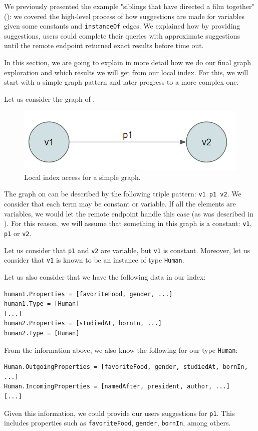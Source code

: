 We previously presented the example  "siblings that have directed a film together" (): we covered the high-level process of how suggestions are made for variables given some constants and \texttt{instanceOf} edges. We explained how by providing suggestions, users could complete their queries with approximate suggestions until the remote endpoint returned exact results before time out. 

In this section, we are going to explain in more detail how we do our final graph exploration and which results we will get from our local index. For this, we will start with a simple graph pattern and later progress to a more complex one.

\begin{example}
Let us consider the graph of .

\begin{figure}[H]
    \centering
        \includegraphics[width=0.5\linewidth]{imagenes/graph1.png}
        \caption{Local index access for a simple graph.}
        \label{fig:example_graph1}
\end{figure}

The graph on  can be described by the following triple pattern: \texttt{v1 p1 v2}. We consider that each term may be constant or variable. If all the elements are variables, we would let the remote endpoint handle this case (as was described in ). For this reason, we will assume that something in this graph is a constant: \texttt{v1}, \texttt{p1} or \texttt{v2}.

Let us consider that \texttt{p1} and \texttt{v2} are variable, but \texttt{v1} is constant. Moreover, let us consider that \texttt{v1} is known to be an instance of type \texttt{Human}.

Let us also consider that we have the following data in our index:
\begin{verbatim}
human1.Properties = [favoriteFood, gender, ...]
human1.Type = [Human]
[...]
human2.Properties = [studiedAt, bornIn, ...]
human2.Type = [Human]
\end{verbatim}

From the information above, we also know the following for our type \texttt{Human}:
\begin{verbatim}
Human.OutgoingProperties = [favoriteFood, gender, studiedAt, bornIn, ...]
Human.IncomingProperties = [namedAfter, president, author, ...]
[...]
\end{verbatim}

Given this information, we could provide our users suggestions for \texttt{p1}. This includes properties such as \texttt{favoriteFood}, \texttt{gender}, \texttt{bornIn}, among others.

\end{example}

